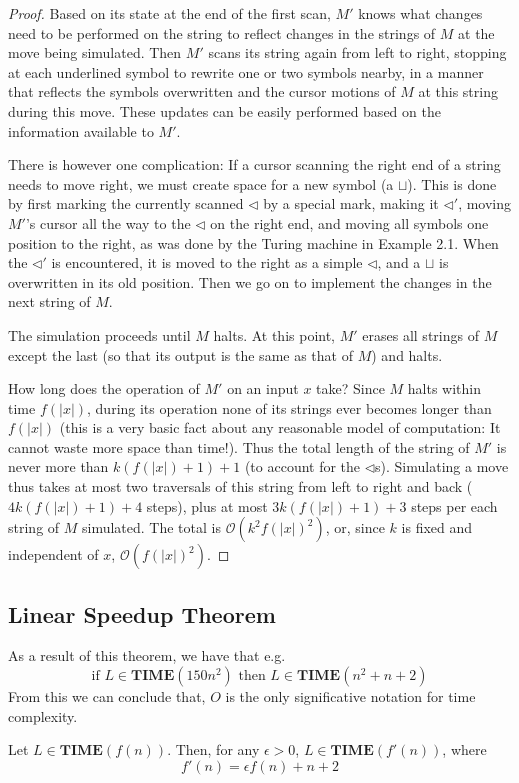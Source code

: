 \documentclass[12pt]{article}
\begin{document}
\begin{proof}
  Based on its state at the end of the first scan, $M'$ knows what changes need to be performed on the string to reflect changes in the strings of $M$ at the move being simulated. Then $M'$ scans its string again from left to right, stopping at each underlined symbol to rewrite one or two symbols nearby, in a manner that reflects the symbols overwritten and the cursor motions of $M$ at this string during this move. These updates can be easily performed based on the information available to $M'$.

  There is however one complication: If a cursor scanning the right end of a string needs to move right, we must create space for a new symbol (a $\sqcup$). This is done by first marking the currently scanned $\lhd$ by a special mark, making it $\lhd'$, moving $M'$'s cursor all the way to the $\lhd$ on the right end, and moving all symbols one position to the right, as was done by the Turing machine in Example 2.1. When the $\lhd'$ is encountered, it is moved to the right as a simple $\lhd$, and a $\sqcup$ is overwritten in its old position. Then we go on to implement the changes in the next string of $M$.
  
  The simulation proceeds until $M$ halts. At this point, $M'$ erases all strings of $M$ except the last (so that its output is the same as that of $M$) and halts.
  
  How long does the operation of $M'$ on an input $x$ take? Since $M$ halts within time $f(|x|)$, during its operation none of its strings ever becomes longer than $f(|x|)$ (this is a very basic fact about any reasonable model of computation: It cannot waste more space than time!). Thus the total length of the string of $M'$ is never more than $k(f(|x|) + 1) + 1$ (to account for the $\lhd$s). Simulating a move thus takes at most two traversals of this string from left to right and back ($4k(f(|x|) + 1) + 4$ steps), plus at most $3k(f(|x|) + 1) + 3$ steps per each string of $M$ simulated. The total is $\mathcal{O}(k^2 f(|x|)^2)$, or, since $k$ is fixed and independent of $x$, $\mathcal{O}(f(|x|)^2)$.
\end{proof}

\subsection{Linear Speedup Theorem}
As a result of this theorem, we have that e.g. 
$$\text{if } L\in\textbf{TIME}(150n^2) \text{ then } L\in\textbf{TIME}(n^2 + n +2)$$  
From this we can conclude that, $O$ is the only significative notation for time complexity.
\begin{defbox}
  Let $L\in\textbf{TIME}(f(n))$. Then, for any $\epsilon>0$, $L\in\textbf{TIME}(f'(n))$, where $$f'(n) = \epsilon f(n)+n+2$$ 
\end{defbox}
\end{document}
